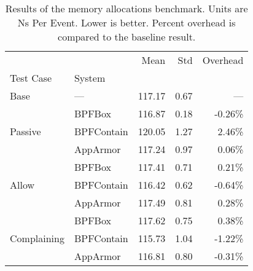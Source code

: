 \begin{table}[htp!]
\centering
\footnotesize
\caption[Results of the memory allocations benchmark]{Results of the memory allocations benchmark. Units are Ns Per Event. Lower is better. Percent overhead is compared to the baseline result.}
\label{tab:phoronix-memory-allocations}
\begin{tabular}{llrrr}
\toprule
            &          &    Mean &   Std & Overhead \\
Test Case & System &         &       &          \\
\midrule
Base & --- &  117.17 &  0.67 &      --- \\
\cline{1-5}
\multirow{3}{*}{Passive} & BPFBox &  116.87 &  0.18 &  -0.26\% \\
            & BPFContain &  120.05 &  1.27 &   2.46\% \\
            & AppArmor &  117.24 &  0.97 &   0.06\% \\
\cline{1-5}
\multirow{3}{*}{Allow} & BPFBox &  117.41 &  0.71 &   0.21\% \\
            & BPFContain &  116.42 &  0.62 &  -0.64\% \\
            & AppArmor &  117.49 &  0.81 &   0.28\% \\
\cline{1-5}
\multirow{3}{*}{Complaining} & BPFBox &  117.62 &  0.75 &   0.38\% \\
            & BPFContain &  115.73 &  1.04 &  -1.22\% \\
            & AppArmor &  116.81 &  0.80 &  -0.31\% \\
\bottomrule
\end{tabular}
\end{table}
